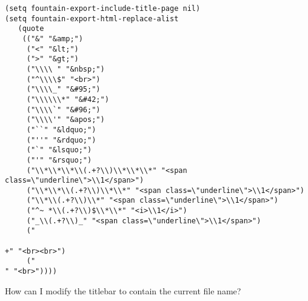 \documentclass[11pt]{article}
\begin{document}
\begin{verbatim}
(setq fountain-export-include-title-page nil)
(setq fountain-export-html-replace-alist
   (quote
    (("&" "&amp;")
     ("<" "&lt;")
     (">" "&gt;")
     ("\\\\ " "&nbsp;")
     ("^\\\\$" "<br>")
     ("\\\\_" "&#95;")
     ("\\\\\\*" "&#42;")
     ("\\\\`" "&#96;")
     ("\\\\'" "&apos;")
     ("``" "&ldquo;")
     ("''" "&rdquo;")
     ("`" "&lsquo;")
     ("'" "&rsquo;")
     ("\\*\\*\\*\\(.+?\\)\\*\\*\\*" "<span class=\"underline\">\\1</span>")
     ("\\*\\*\\(.+?\\)\\*\\*" "<span class=\"underline\">\\1</span>")
     ("\\*\\(.+?\\)\\*" "<span class=\"underline\">\\1</span>")
     ("^~ *\\(.+?\\)$\\*\\*" "<i>\\1</i>")
     ("_\\(.+?\\)_" "<span class=\"underline\">\\1</span>")
     ("

+" "<br><br>")
     ("
" "<br>")))) 
\end{verbatim}

\label{sec:orgdc93653}
How can I modify the titlebar to contain the current file name?
\end{document}
